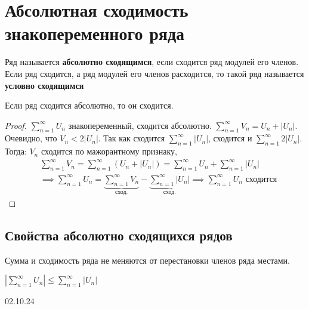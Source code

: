 \section{Абсолютная сходимость знакопеременного ряда}
\begin{opr}
    Ряд называется \textbf{абсолютно сходящимся}, если сходится ряд модулей его членов.
    Если ряд сходится, а ряд модулей его членов расходится, то такой ряд называется 
    \textbf{условно сходящимся}
\end{opr}

\begin{thm}
    Если ряд сходится абсолютно, то он сходится.\\
    \begin{proof}
        \(\sum_{n=1}^{\infty}U_{n}\) знакопеременный, сходится абсолютно.
        \(\sum_{n=1}^{\infty}V_{n} = U_{n} + |U_{n}|\).
        Очевидно, что \(V_{n} < 2|U_{n}|\). 
        Так как сходится \(\sum_{n=1}^{\infty} |U_{n}|\), 
        сходится и \(\sum_{n=1}^{\infty} 2|U_{n}|\).
        Тогда: \(V_{n}\) сходится по мажорантному признаку,
        \begin{equation}
            \begin{align*}
                &\sum_{n=1}^{\infty}V_{n} = \sum_{n=1}^{\infty}(U_{n} + |U_{n}|) = \sum_{n=1}^{\infty}U_{n} + \sum_{n=1}^{\infty}|U_{n}|\\
                &\implies \sum_{n=1}^{\infty}U_{n} = \underbrace{\sum_{n=1}^{\infty}V_{n}}_{\text{сход.}} - \underbrace{\sum_{n=1}^{\infty}|U_{n}|}_{\text{сход.}} \implies \sum_{n=1}^{\infty}U_{n} \text{ сходится}
            \end{align*}
        \end{equation}
    \end{proof}
\end{thm}

\subsection{Свойства абсолютно сходящихся рядов}
\begin{sv}
    Сумма и сходимость ряда не меняются 
    от перестановки членов ряда местами.
\end{sv}

\begin{sv}
    \(|\sum_{n=1}^{\infty}U_{n}| \leq \sum_{n=1}^{\infty}|U_{n}|\)
\end{sv}



\vspace{2cm}
\begin{center}\large{02.10.24}\end{center}





